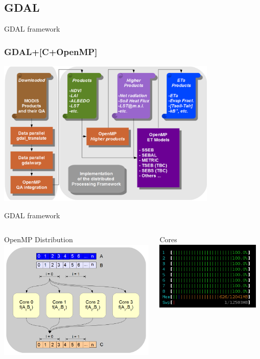 \documentclass[aspectratio=169,unknownkeysallowed,xcolor=dvipsnames,beamer]{beamer} %
\begin{document}
\subsection{GDAL}
\begin{frame}[fragile]{GDAL framework}
\frametitle{ GDAL+[C+OpenMP]}
\begin{center}
 \includegraphics[width=10.5cm]{chain2}
\end{center}
\end{frame}

\begin{frame}[fragile]{GDAL framework}

\begin{columns}
\begin{center}
 OpenMP Distribution \\
 \includegraphics[width=7.5cm]{chain1}
\end{center}
\begin{center}
 Cores \\
 \includegraphics[width=5cm]{cores}
\end{center}
\end{columns}
\end{frame}
\end{document}
